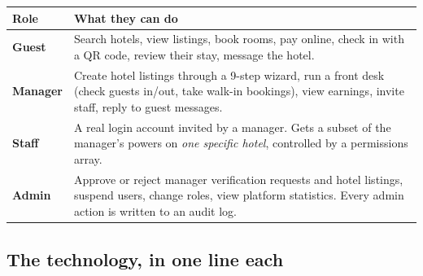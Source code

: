 \documentclass[11pt,a4paper]{article}
\begin{document}
\begin{longtable}{@{}p{2.4cm}p{12.4cm}@{}}
\toprule
\textbf{Role} & \textbf{What they can do} \\
\midrule
\endhead
\textbf{Guest} & Search hotels, view listings, book rooms, pay online, check in
with a QR code, review their stay, message the hotel. \\
\addlinespace
\textbf{Manager} & Create hotel listings through a 9-step wizard, run a front
desk (check guests in/out, take walk-in bookings), view earnings, invite staff,
reply to guest messages. \\
\addlinespace
\textbf{Staff} & A real login account invited by a manager. Gets a subset of the
manager's powers on \emph{one specific hotel}, controlled by a permissions array. \\
\addlinespace
\textbf{Admin} & Approve or reject manager verification requests and hotel
listings, suspend users, change roles, view platform statistics. Every admin
action is written to an audit log. \\
\bottomrule
\end{longtable}

\subsection{The technology, in one line each}
\end{document}
